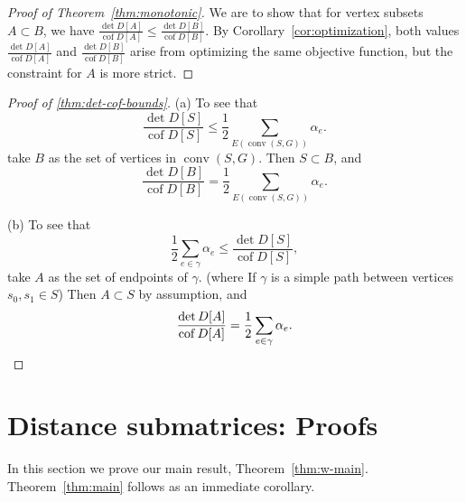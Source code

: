 \documentclass{amsart}
\theoremstyle{definition}
\DeclareMathOperator{\cof}{cof}
\DeclareMathOperator{\conv}{conv}
\newcommand{\display}{\displaystyle}
\begin{document}
\begin{proof}[Proof of Theorem~\ref{thm:monotonic}]
We are to show that for vertex subsets $A \subset B$, we have
$\displaystyle 
\frac{\det D[A]}{\cof D[A]} \leq \frac{\det D[B]}{\cof D[B]}.
$
By Corollary~\ref{cor:optimization}, both values $\display \frac{\det D[A]}{\cof D[A]}$ and $\display \frac{\det D[B]}{\cof D[B]}$ arise from optimizing the same objective function, 
but the constraint for $A$ is more strict.
\end{proof}

\begin{proof}[Proof of \ref{thm:det-cof-bounds}]
(a)
To see that
\begin{equation*}
 \frac{\det D[S]}{\cof D[S]} \leq \frac12 \sum_{E(\conv(S, G))} \alpha_e .
\end{equation*}
take $B$ as the set of vertices in $\conv(S, G)$.
Then $S \subset B$, and 
\[
 \frac{\det D[B]}{\cof D[B]} = \frac12 \sum_{E(\conv(S, G))} \alpha_e .
\]

(b) 
To see that
\begin{equation*}
	\frac12 \sum_{e \in \gamma} \alpha_e \leq \frac{\det D[S]}{\cof D[S]},
\end{equation*}
take $A$ as the set of endpoints of $\gamma$.
(where 
If $\gamma$ is a simple path between vertices $s_0, s_1 \in S$)
Then $A \subset S$ by assumption, and
\[
	\frac{\det D[A]}{\cof D[A]}
	= \frac12 \sum_{e \in \gamma} \alpha_e .
	\qedhere
\]
\end{proof}


\section{Distance submatrices: Proofs}
In this section we prove our main result, Theorem~\ref{thm:w-main}.
Theorem~\ref{thm:main} follows as an immediate corollary.
\end{document}
